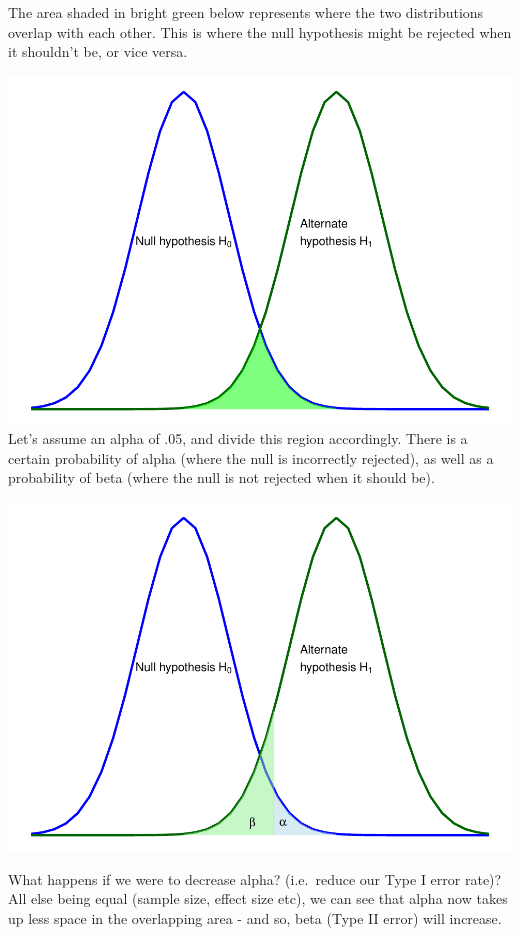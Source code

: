 \documentclass[
]{book}
\begin{document}
The area shaded in bright green below represents where the two distributions overlap with each other. This is where the null hypothesis might be rejected when it shouldn't be, or vice versa.

\includegraphics{_main_files/figure-latex/unnamed-chunk-82-1.pdf}
Let's assume an alpha of .05, and divide this region accordingly. There is a certain probability of alpha (where the null is incorrectly rejected), as well as a probability of beta (where the null is not rejected when it should be).

\includegraphics{_main_files/figure-latex/unnamed-chunk-83-1.pdf}

What happens if we were to decrease alpha? (i.e.~reduce our Type I error rate)? All else being equal (sample size, effect size etc), we can see that alpha now takes up less space in the overlapping area - and so, beta (Type II error) will increase.
\end{document}
